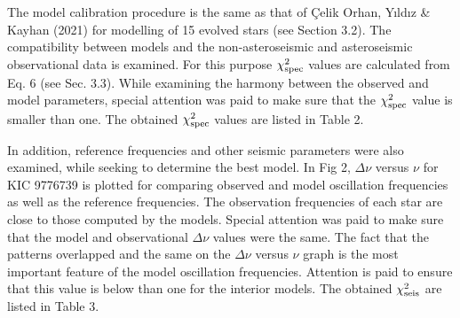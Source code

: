 \documentclass[a4paper,fleqn,usenatbib]{mnras}     %
\begin{document}
{The model calibration procedure 
is the same as that of \c{C}elik Orhan, Y{\i}ld{\i}z \& Kayhan (2021) 
for modelling of 15 evolved stars (see Section 3.2).
The compatibility between models and the 
non-asteroseismic and asteroseismic 
observational data is examined.
For this purpose ${{\chi^2_{\rm spec}}}$ values are calculated 
from Eq. 6 (see Sec. 3.3). 
While examining the harmony between the 
observed and model parameters, 
special attention was paid to
 make sure that the ${{\chi^2_{\rm spec}}}$ value is smaller than one. 
The obtained ${{\chi^2_{\rm spec}}}$ values are listed in Table 2.

In addition, reference frequencies 
and other seismic parameters were also examined,
 while seeking to determine the best model.
In Fig 2, ${\Delta\nu}$ versus ${\nu}$ 
for KIC 9776739 is plotted for comparing 
 observed and model oscillation frequencies 
as well as the reference frequencies.
The observation frequencies of 
each star are 
close to those computed by the models.
Special attention was paid to make 
sure that the model and 
observational ${\Delta\nu}$ values were the same. 
The fact that the patterns 
overlapped and 
the same on the  ${\Delta\nu}$ versus ${\nu}$ graph 
is the most important feature of the model oscillation frequencies.
Attention is paid to ensure that this value is below 
than one for the interior models.
The obtained ${{\chi^2_{\rm seis}}}$ are listed in Table 3.
}
\end{document}
